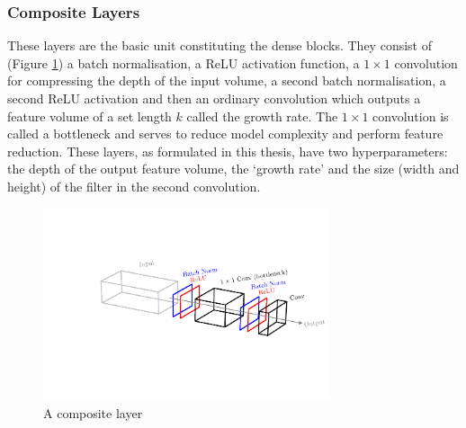 \subsubsection{Composite Layers}
These layers are the basic unit constituting the dense blocks. They consist of (Figure \ref{fig:machine_learning:composite_layer}) a batch normalisation, a ReLU activation function, a $1\times{}1$ convolution for compressing the depth of the input volume, a second batch normalisation, a second ReLU activation and then an ordinary convolution which outputs a feature volume of a set length $k$ called the growth rate. The $1\times{}1$ convolution is called a bottleneck and serves to reduce model complexity and perform feature reduction. These layers, as formulated in this thesis, have two hyperparameters: the depth of the output feature volume, the `growth rate' and the size (width and height) of the filter in the second convolution. 
\begin{figure}[h!]
    \includegraphics[width=0.75\textwidth]{figures/machine_learning/composite_layer.pdf}
    \caption{A composite layer}
        \label{fig:machine_learning:composite_layer}
\end{figure}


